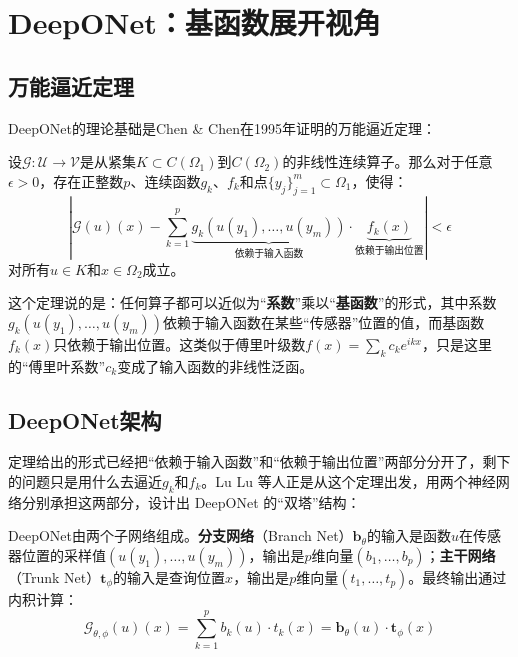 \section{DeepONet：基函数展开视角}
\label{sec:deeponet}

\subsection{万能逼近定理}

DeepONet的理论基础是Chen \& Chen在1995年证明的万能逼近定理：

\begin{theorem}[算子的万能逼近定理]
设$\mathcal{G}: \mathcal{U} \to \mathcal{V}$是从紧集$K \subset C(\Omega_1)$到$C(\Omega_2)$的非线性连续算子。那么对于任意$\epsilon > 0$，存在正整数$p$、连续函数$g_k$、$f_k$和点$\{y_j\}_{j=1}^m \subset \Omega_1$，使得：
\begin{equation}
    \left| \mathcal{G}(u)(x) - \sum_{k=1}^{p} \underbrace{g_k\left(u(y_1), \ldots, u(y_m)\right)}_{\text{依赖于输入函数}} \cdot \underbrace{f_k(x)}_{\text{依赖于输出位置}} \right| < \epsilon
\end{equation}
对所有$u \in K$和$x \in \Omega_2$成立。
\end{theorem}

\begin{remark}[直觉理解]
这个定理说的是：任何算子都可以近似为“\textbf{系数}”乘以“\textbf{基函数}”的形式，其中系数$g_k(u(y_1), \ldots, u(y_m))$依赖于输入函数在某些“传感器”位置的值，而基函数$f_k(x)$只依赖于输出位置。这类似于傅里叶级数$f(x) = \sum_k c_k e^{ikx}$，只是这里的“傅里叶系数”$c_k$变成了输入函数的非线性泛函。
\end{remark}

\subsection{DeepONet架构}

定理给出的形式已经把“依赖于输入函数”和“依赖于输出位置”两部分分开了，剩下的问题只是用什么去逼近$g_k$和$f_k$。Lu Lu 等人正是从这个定理出发，用两个神经网络分别承担这两部分，设计出 DeepONet 的“双塔”结构：

\begin{definition}[DeepONet]
DeepONet由两个子网络组成。\textbf{分支网络}（Branch Net）$\mathbf{b}_\theta$的输入是函数$u$在传感器位置的采样值$(u(y_1), \ldots, u(y_m))$，输出是$p$维向量$(b_1, \ldots, b_p)$；\textbf{主干网络}（Trunk Net）$\mathbf{t}_\phi$的输入是查询位置$x$，输出是$p$维向量$(t_1, \ldots, t_p)$。最终输出通过内积计算：
\begin{equation}
    \mathcal{G}_{\theta, \phi}(u)(x) = \sum_{k=1}^{p} b_k(u) \cdot t_k(x) = \mathbf{b}_\theta(u) \cdot \mathbf{t}_\phi(x)
\end{equation}
\end{definition}

